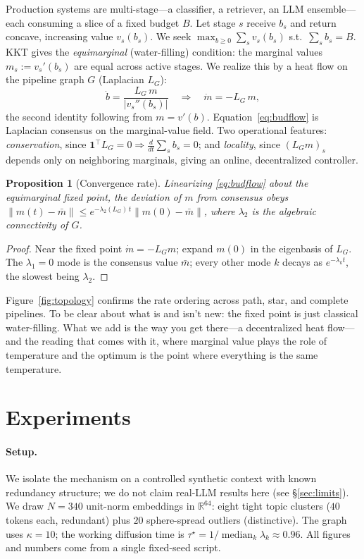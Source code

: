 \documentclass[11pt]{article}
\newtheorem{proposition}{Proposition}
\newcommand{\R}{\mathbb{R}}
\newcommand{\norm}[1]{\left\lVert#1\right\rVert}
\begin{document}
Production systems are multi-stage---a classifier, a retriever, an LLM ensemble---each consuming
a slice of a fixed budget $B$. Let stage $s$ receive $b_s$ and return concave, increasing value
$v_s(b_s)$. We seek $\max_{b\ge0}\sum_s v_s(b_s)$ s.t.\ $\sum_s b_s=B$. KKT gives the
\emph{equimarginal} (water-filling) condition: the marginal values $m_s:=v_s'(b_s)$ are equal
across active stages. We realize this by a heat flow on the pipeline graph $G$ (Laplacian $L_G$):
\begin{equation}
\label{eq:budflow}
\dot b=\frac{L_G\,m}{|v_s''(b_s)|}\quad\Longrightarrow\quad \dot m=-L_G\,m ,
\end{equation}
the second identity following from $m=v'(b)$. Equation~\eqref{eq:budflow} is Laplacian consensus
on the marginal-value field. Two operational features: \emph{conservation}, since
$\mathbf1^\top L_G=0\Rightarrow\frac{d}{dt}\sum_s b_s=0$; and \emph{locality}, since $(L_G m)_s$
depends only on neighboring marginals, giving an online, decentralized controller.

\begin{proposition}[Convergence rate]
\label{prop:rate}
Linearizing \eqref{eq:budflow} about the equimarginal fixed point, the deviation of $m$ from
consensus obeys $\norm{m(t)-\bar m}\le e^{-\lambda_2(L_G)\,t}\norm{m(0)-\bar m}$, where
$\lambda_2$ is the algebraic connectivity of $G$.
\end{proposition}
\begin{proof}
Near the fixed point $\dot m=-L_G m$; expand $m(0)$ in the eigenbasis of $L_G$. The $\lambda_1=0$
mode is the consensus value $\bar m$; every other mode $k$ decays as $e^{-\lambda_k t}$, the
slowest being $\lambda_2$.
\end{proof}
\noindent
Figure~\ref{fig:topology} confirms the rate ordering across path, star, and complete pipelines.
To be clear about what is and isn't new: the fixed point is just classical water-filling. What we
add is the way you get there---a decentralized heat flow---and the reading that comes with it, where
marginal value plays the role of temperature and the optimum is the point where everything is the
same temperature.

\section{Experiments}
\label{sec:exp}

\paragraph{Setup.}
We isolate the mechanism on a controlled synthetic context with known redundancy structure; we do
not claim real-LLM results here (see \S\ref{sec:limits}). We draw $N=340$ unit-norm embeddings in
$\R^{64}$: eight tight topic clusters ($40$ tokens each, redundant) plus $20$ sphere-spread
outliers (distinctive). The graph uses $\kappa=10$; the working diffusion time is
$\tau^\star=1/\operatorname{median}_k\lambda_k\approx0.96$. All figures and numbers come from a
single fixed-seed script.
\end{document}
